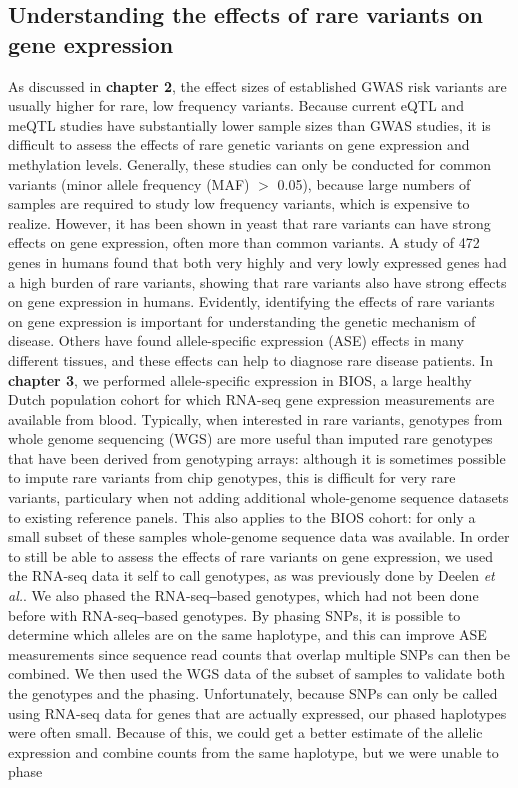 \subsection{Understanding the effects of rare variants on gene expression}

As discussed in \textbf{chapter 2}, the effect sizes of established GWAS risk variants are usually higher for rare, low frequency variants. Because current eQTL and meQTL studies have substantially lower sample sizes than GWAS studies, it is difficult to assess the effects of rare genetic variants on gene expression and methylation levels. Generally, these studies can only be conducted for common variants (minor allele frequency (MAF) $>$ 0.05), because large numbers of samples are required to study low frequency variants, which is expensive to realize. However, it has been shown in yeast that rare variants can have strong effects on gene expression, often more than common variants\cite{bloomRareVariantsContribute2019}. A study of 472 genes in humans found that both very highly and very lowly expressed genes had a high burden of rare variants\cite{zhaoBurdenRareVariants2016}, showing that rare variants also have strong effects on gene expression in humans. Evidently, identifying the effects of rare variants on gene expression is important for understanding the genetic mechanism of disease. Others have found allele-specific expression (ASE) effects in many different tissues\cite{castelVastResourceAllelic2020}, and these effects can help to diagnose rare disease patients\cite{mohammadiGeneticRegulatoryVariation2019}. In \textbf{chapter 3}, we performed allele-specific expression in BIOS, a large healthy Dutch population cohort for which RNA-seq gene expression measurements are available from blood. Typically, when interested in rare variants, genotypes from whole genome sequencing (WGS) are more useful than imputed rare genotypes that have been derived from genotyping arrays: although it is sometimes possible to impute rare variants from chip genotypes, this is difficult for very rare variants, particulary when  not adding additional whole-genome sequence datasets to existing reference panels\cite{hoffmannStrategiesImputingAnalyzing2015}. This also applies to the BIOS cohort: for only a small subset of these samples whole-genome sequence data was available. In order to still be able to assess the effects of rare variants on gene expression, we used the RNA-seq data it self to call genotypes, as was previously done by Deelen \emph{et al.}\cite{deelenCallingGenotypesPublic2015}. We also phased the RNA-seq‒based genotypes, which had not been done before with RNA-seq‒based genotypes. By phasing SNPs, it is possible to determine which alleles are on the same haplotype, and this can improve ASE measurements since sequence read counts that overlap multiple SNPs can then be combined. We then used the WGS data of the subset of samples to validate both the genotypes and the phasing. Unfortunately, because SNPs can only be called using RNA-seq data for genes that are actually expressed, our phased haplotypes were often small. Because of this, we could get a better estimate of the allelic expression and combine counts from the same haplotype, but we were unable to phase 